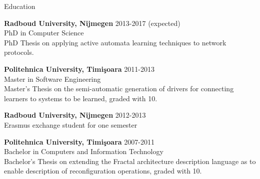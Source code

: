 \documentclass{resume} %
\newcommand{\nwork}[1]{\newblock{\textit{Notable Work:} #1}}
\begin{document}

\begin{rSection}{Education}
\item {\bf Radboud University, Nijmegen} \hfill 2013-2017 (expected) \\
PhD in Computer Science \\
PhD Thesis on applying active automata learning techniques to network protocols. 
\smallskip{}
\item {\bf Politehnica University, Timi\c{s}oara} \hfill 2011-2013 \\
Master in Software Engineering \\
Master's Thesis on the semi-automatic generation of drivers for connecting learners to systems to be learned, graded with 10. 
\smallskip{}
\item {\bf Radboud University, Nijmegen} \hfill 2012-2013 \\
Erasmus exchange student for one semester
\smallskip{}
\item {\bf Politehnica University, Timi\c{s}oara} \hfill 2007-2011 \\
Bachelor in Computers and Information Technology \\
Bachelor's Thesis on extending the Fractal architecture description language as to enable description of reconfiguration operations, graded with 10.
\end{rSection}
\end{document}
